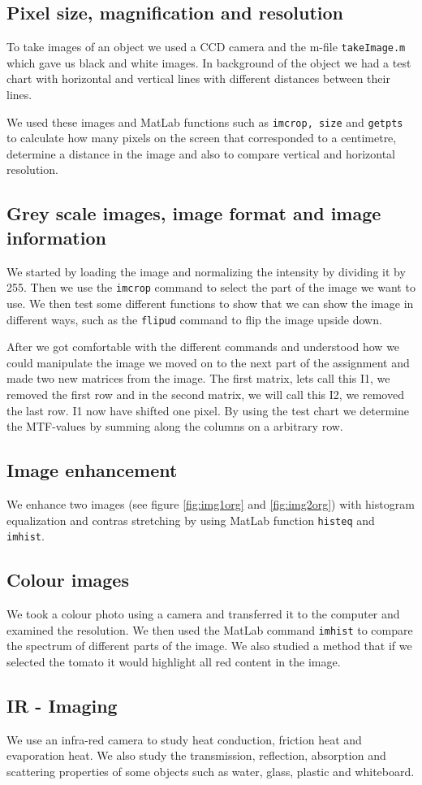 \subsection{Pixel size, magnification and resolution}
To take images of an object we used a CCD camera and the m-file \texttt{takeImage.m} which gave us black and white images. In background of the object we had a test chart with horizontal and vertical lines with different distances between their lines. 

We used these images and MatLab functions such as \texttt{imcrop, size} and \texttt{getpts} to calculate how many pixels on the screen that corresponded to a centimetre, determine a distance in the image and also to compare vertical and horizontal resolution. 

\subsection{Grey scale images, image format and image information}
We started by loading the image and normalizing the intensity by dividing it by 255. Then we use the \texttt{imcrop} command to select the part of the image we want to use. We then test some different functions to show that we can show the image in different ways, such as the \texttt{flipud} command to flip the image upside down. 

After we got comfortable with the different commands and understood how we could manipulate the image we moved on to the next part of the assignment and made two new matrices from the image. The first matrix, lets call this I1, we removed the first row and in the second matrix, we will call this I2, we removed the last row. I1 now have shifted one pixel.
By using the test chart we determine the MTF-values by summing along the columns on a arbitrary row.

\subsection{Image enhancement}
We enhance two images (see figure \ref{fig:img1org} and \ref{fig:img2org}) with histogram equalization and contras stretching by using MatLab function \texttt{histeq} and \texttt{imhist}. 

\subsection{Colour images}
We took a colour photo using a camera and transferred it to the computer and examined the resolution. We then used the MatLab command \texttt{imhist} to compare the spectrum of different parts of the image. %
We also studied a method that if we selected the tomato it would highlight all red content in the image.

\subsection{IR - Imaging}
We use an infra-red camera to study heat conduction, friction heat and evaporation heat. We also study the transmission, reflection, absorption and scattering properties of some objects such as water, glass, plastic and whiteboard.